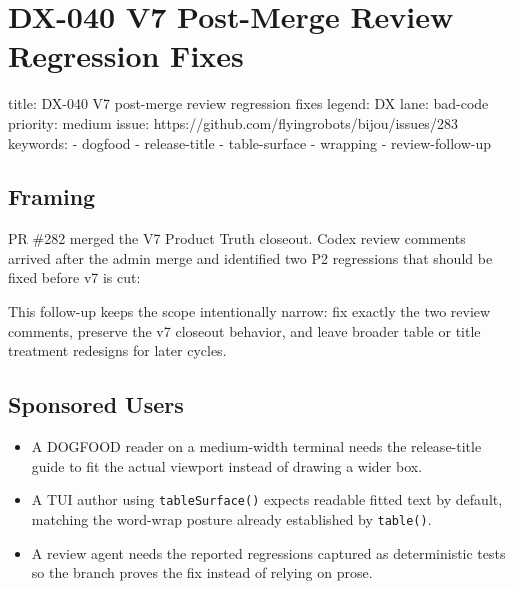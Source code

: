 \chapter{DX-040 V7 Post-Merge Review Regression Fixes}\label{record-136}

\smallskip

\begin{RecordMeta}
title: DX-040 V7 post-merge review regression fixes
legend: DX
lane: bad-code
priority: medium
issue: https://github.com/flyingrobots/bijou/issues/283
keywords:
  - dogfood
  - release-title
  - table-surface
  - wrapping
  - review-follow-up

\end{RecordMeta}

\section{Framing}\label{record-136-framing}

PR \#282 merged the V7 Product Truth closeout. Codex review comments arrived after the admin merge and identified two P2 regressions that should be fixed before v7 is cut:



This follow-up keeps the scope intentionally narrow: fix exactly the two review comments, preserve the v7 closeout behavior, and leave broader table or title treatment redesigns for later cycles.

\section{Sponsored Users}\label{record-136-sponsored-users}

\begin{itemize}
\tightlist
\item
  A DOGFOOD reader on a medium-width terminal needs the release-title guide to fit the actual viewport instead of drawing a wider box.
\item
  A TUI author using \texttt{t\allowbreak{}a\allowbreak{}b\allowbreak{}l\allowbreak{}e\allowbreak{}S\allowbreak{}u\allowbreak{}r\allowbreak{}f\allowbreak{}a\allowbreak{}c\allowbreak{}e\allowbreak{}(\allowbreak{})} expects readable fitted text by default, matching the word-wrap posture already established by \texttt{t\allowbreak{}a\allowbreak{}b\allowbreak{}l\allowbreak{}e\allowbreak{}(\allowbreak{})}.
\item
  A review agent needs the reported regressions captured as deterministic tests so the branch proves the fix instead of relying on prose.
\end{itemize}

